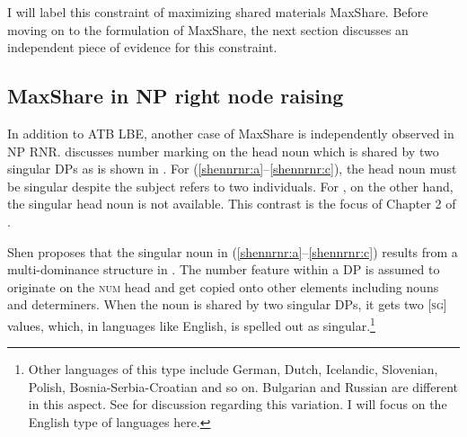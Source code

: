 \documentclass[output=paper]{langscibook}
\begin{document}
I will label this constraint of maximizing shared materials MaxShare. Before moving on to the formulation of MaxShare, the next section discusses an independent piece of evidence for this constraint.

\subsection{MaxShare in NP right node raising}
\label{shensect:rnr}

In addition to ATB LBE, another case of MaxShare is independently observed in NP RNR.
\citet{Shen:2018a} discusses number marking on the head noun which is shared by two singular DPs as is shown in . 
For (\ref{shennrnr:a}--\ref{shennrnr:c}), the head noun must be singular despite the subject refers to two individuals. 
For , on the other hand, the singular head noun is not available. 
This contrast is the focus of Chapter 2 of \citet{Shen:2018a}.

\ea 
	\label{shennrnr}
	\z 
\z 
{}
Shen proposes that the singular noun in (\ref{shennrnr:a}--\ref{shennrnr:c}) results from a multi-dominance structure in . The number feature within a DP is assumed to originate on the \textsc{num} head and get copied onto other elements including nouns and determiners. When the noun is shared by two singular DPs, it gets two [\textsc{sg}] values, which, in languages like English, is spelled out as singular.\footnote{Other languages of this type include German, Dutch, Icelandic, Slovenian, Polish, Bosnia-Serbia-Croatian and so on. Bulgarian and Russian are different in this aspect. See \citet{Shen:2019} for discussion regarding this variation. I will focus on the English type of languages here.} 


%
\end{document}
